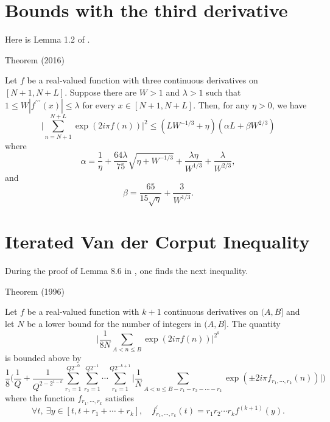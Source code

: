   
\par 
\section{Bounds with the third derivative}


Here is Lemma 1.2 of
\cite{Hiary*16}.
\par 
\begin{thm}{Theorem (2016)}

  Let $f$ be a real-valued function with three continuous derivatives
  on $[N+1, N+L]$. Suppose there are $W > 1$ and $\lambda > 1$ such
  that $1 \le W |f^{\prime\prime\prime}(x)| \le \lambda$ for every $x\in [N+1,
  N+L]$. Then, for any $\eta > 0$, we have
  $$
  \biggl|\sum_{n= N+1}^{N+L}
  \exp( 2i\pi f(n)) \biggr|^2
  \le (LW^{-1/3} +\eta) (\alpha L + \beta W^{2/3})
  $$
  where
  $$
  \alpha = \frac{1}{\eta} +\frac{64\lambda}{75}
  \sqrt{\eta + W^{-1/3}}+\frac{\lambda\eta}{W^{1/3}}
  +\frac{\lambda}{W^{2/3}},
  $$
  and
  $$
  \beta = \frac{65}{15\sqrt{\eta}} + \frac{3}{W^{1/3}}.
  $$
\end{thm}


  
\par 
\section{Iterated Van der Corput Inequality}


During the proof of Lemma 8.6 in 
  \cite{Granville-Ramare*96},
  one finds the next inequality.
\par 
\begin{thm}{Theorem (1996)}

  Let $f$ be a real-valued function with $k+1$ continuous derivatives
  on $(A, B]$ and let $N$ be a lower bound for the number of integers
  in $(A,B]$. The quantity
  $$
  \biggl|\frac{1}{8N}
  \sum_{A < n\le B} \exp(2 i \pi f(n))\biggr|^{2^k}
	    $$
	    is bounded above by
	    $$
	    \frac{1}{8}\biggl(
	    \frac{1}{Q} + \frac{1}{Q^{2-2^{1-k}}}
	    \sum_{r_1 =1}^{Q2^{-0}}
	    \sum_{r_2 =1}^{Q2^{-1}}
	    \cdots
	    \sum_{r_k =1}^{Q2^{-k+1}}
	    \biggl|
	    \frac{1}{N}
	    \sum_{A < n \le B-r_1-r_2-\cdots-r_k}
		    \exp(\pm 2i\pi f_{r_1,\cdots,r_k}(n))   
	    \biggr|
	    \biggr)
		      $$
		      where the function $f_{r_1,\cdots,r_k}$ satisfies
		      $$
		      \forall t,\ \exists y\in[t, t + r_1 + \cdots + r_k],
		      \quad
		      f^{\prime}_{r_1,\cdots, r_k}(t) = r_1r_2\cdots r_k f^{(k+1)}(y).
		      $$
\end{thm}



